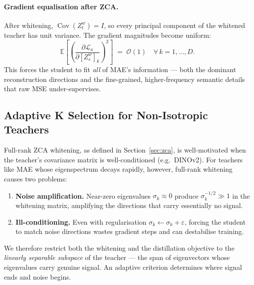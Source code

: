 \documentclass[11pt,a4paper]{article}
\newcommand{\E}{\mathbb{E}}
\newcommand{\calL}{\mathcal{L}}
\newcommand{\Cov}{\operatorname{Cov}}
\begin{document}
\paragraph{Gradient equalisation after ZCA.}
After whitening, $\Cov(Z_t^w) = I$, so every principal component of the whitened
teacher has unit variance.  The gradient magnitudes become uniform:
\begin{equation}
    \E\!\left[\left(\frac{\partial \calL_a}{\partial [Z_s^w]_k}\right)^{\!2}\right]
    \;=\; \mathcal{O}(1) \quad \forall\, k = 1, \ldots, D.
\label{eq:grad_equal}
\end{equation}
This forces the student to fit \emph{all} of MAE's information — both the
dominant reconstruction directions and the fine-grained, higher-frequency
semantic details that raw MSE under-supervises.

\subsection{Adaptive K Selection for Non-Isotropic Teachers}
\label{sec:topk}

Full-rank ZCA whitening, as defined in Section~\ref{sec:zca}, is well-motivated
when the teacher's covariance matrix is well-conditioned (e.g.\ DINOv2).
For teachers like MAE whose eigenspectrum decays rapidly, however, full-rank
whitening causes two problems:
\begin{enumerate}
    \item \textbf{Noise amplification.}  Near-zero eigenvalues $\sigma_k \approx 0$
          produce $\sigma_k^{-1/2} \gg 1$ in the whitening matrix, amplifying
          the directions that carry essentially no signal.
    \item \textbf{Ill-conditioning.}  Even with regularisation $\sigma_k \leftarrow
          \sigma_k + \varepsilon$, forcing the student to match noise directions
          wastes gradient steps and can destabilise training.
\end{enumerate}

We therefore restrict both the whitening and the distillation objective to the
\emph{linearly separable subspace} of the teacher — the span of eigenvectors
whose eigenvalues carry genuine signal.  An adaptive criterion determines where
signal ends and noise begins.
\end{document}

